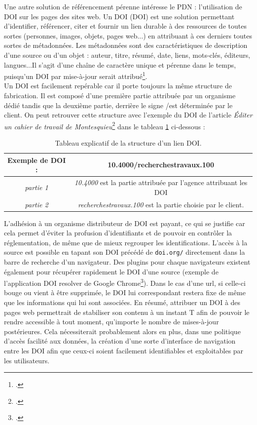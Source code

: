 \documentclass[a4paper,12pt,twoside]{book}
\begin{document}
Une autre solution de référencement pérenne intéresse le \acrshort{PDN} : l'utilisation de DOI sur les pages des sites web. Un DOI (\acrlong{DOI}) est une solution permettant d'identifier, référencer, citer et fournir un lien durable à des ressources de toutes sortes (personnes, images, objets, pages web...) en attribuant à ces derniers toutes sortes de métadonnées. Les métadonnées sont des caractéristiques de description d'une source ou d'un objet : auteur, titre, résumé, date, liens, mots-clés, éditeurs, langues...Il s'agit d'une chaîne de caractère unique et pérenne dans le temps, puisqu'un DOI par mise-à-jour serait attribué\footcite{DOI}. \\
   Un DOI est facilement repérable car il porte toujours la même structure de fabrication. Il est composé d'une première partie attribuée par un organisme dédié tandis que la deuxième partie, derrière le signe \og /\fg est déterminée par le client. On peut retrouver cette structure avec l'exemple du DOI de l'article \og \textit{Éditer un cahier de travail de Montesquieu}\footcite{montesquieu}\fg{} dans le tableau \ref{DOI} ci-dessous :
   
   \begin{table}[H]
\centering
\begin{tabular}{|c|c|}
\hline
 \cellcolor{lightgray}Exemple de DOI : &  \textbf{10.4000/recherchestravaux.100} \\
\hline
\textit{partie 1} & \textit{10.4000} est la partie attribuée par l'agence attribuant les DOI \\
\hline
\textit{partie 2} & \textit{recherchestravaux.100} est la partie choisie par le client. \\
\hline
\end{tabular}
\caption{Tableau explicatif de la structure d'un lien DOI.}
\label{DOI}
\end{table}

L'adhésion à un organisme distributeur de DOI est payant, ce qui se justifie car cela permet d'éviter la profusion d'identifiants et de pouvoir en contrôler la réglementation, de même que de mieux regrouper les identifications. L'accès à la source est possible en tapant son DOI précédé de \texttt{doi.org/} directement dans la barre de recherche d'un navigateur. Des plugins pour chaque navigateurs existent également pour récupérer rapidement le DOI d'une source (exemple de l'application \og DOI resolver \fg{} de Google Chrome\footcite{doi-resolver}). Dans le cas d'une url, si celle-ci bouge ou vient à être supprimée, le DOI lui correspondant restera fixe de même que les informations qui lui sont associées. En résumé, attribuer un DOI à des pages web permettrait de stabiliser son contenu à un instant T afin de pouvoir le rendre accessible à tout moment, qu'importe le nombre de mises-à-jour postérieures. Cela nécessiterait probablement alors en plus, dans une politique d'accès facilité aux données, la création d'une sorte d'interface de navigation entre les DOI afin que ceux-ci soient facilement identifiables et exploitables par les utilisateurs.
\end{document}
